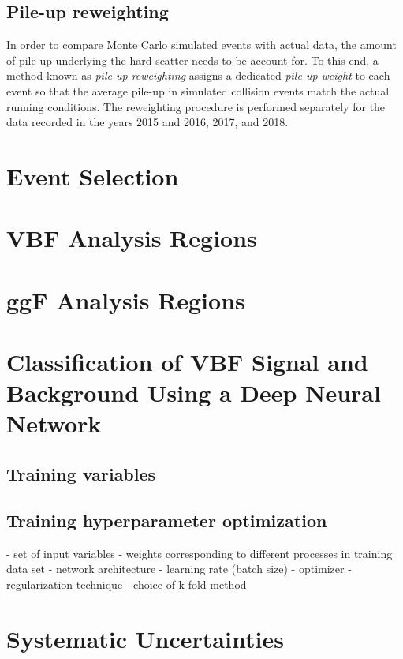 \subsection{Pile-up reweighting}
In order to compare Monte Carlo simulated events with actual data, the amount of pile-up underlying the hard scatter needs to be account for.
To this end, a method known as \emph{pile-up reweighting} assigns a dedicated \emph{pile-up weight} to each event so that the average pile-up in simulated collision events match the actual running conditions. The reweighting procedure is performed separately for the data recorded in the years 2015 and 2016, 2017, and 2018.



\section{Event Selection}
\section{VBF Analysis Regions}
\section{ggF Analysis Regions}

\section{Classification of VBF Signal and Background Using a Deep Neural Network}
\subsection{Training variables}
\subsection{Training hyperparameter optimization}

- set of input variables
- weights corresponding to different processes in training data set
- network architecture
- learning rate (batch size)
- optimizer
- regularization technique
- choice of k-fold method


\section{Systematic Uncertainties}
